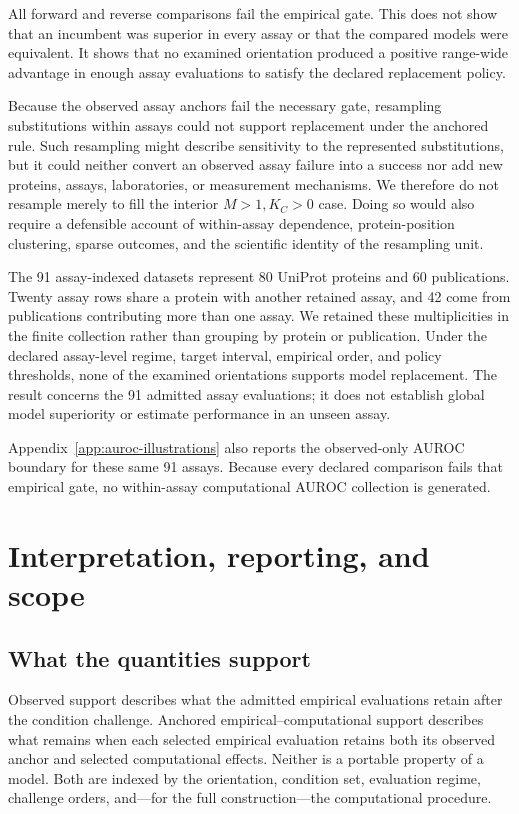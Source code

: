 \documentclass[11pt]{article}
\theoremstyle{remark}
\begin{document}
All forward and reverse comparisons fail the empirical gate. This does not show
that an incumbent was superior in every assay or that the compared models were
equivalent. It shows that no examined orientation produced a positive
range-wide advantage in enough assay evaluations to satisfy the declared
replacement policy.

Because the observed assay anchors fail the necessary gate, resampling
substitutions within assays could not support replacement under the anchored
rule. Such resampling might describe sensitivity to the represented
substitutions, but it could neither convert an observed assay failure into a
success nor add new proteins, assays, laboratories, or measurement mechanisms.
We therefore do not resample merely to fill the interior $M>1,K_C>0$ case.
Doing so would also require a defensible account of within-assay dependence,
protein-position clustering, sparse outcomes, and the scientific identity of
the resampling unit.

The 91 assay-indexed datasets represent 80 UniProt proteins and 60
publications. Twenty assay rows share a protein with another retained assay,
and 42 come from publications contributing more than one assay. We retained
these multiplicities in the finite collection rather than grouping by protein
or publication. Under the declared assay-level regime, target interval,
empirical order, and policy thresholds, none of the examined orientations
supports model replacement. The result concerns the 91 admitted assay
evaluations; it does not establish global model superiority or estimate
performance in an unseen assay.

Appendix~\ref{app:auroc-illustrations} also reports the observed-only AUROC
boundary for these same 91 assays. Because every declared comparison fails
that empirical gate, no within-assay computational AUROC collection is
generated.


\section{Interpretation, reporting, and scope}
\label{sec:discussion}

\subsection{What the quantities support}

Observed support describes what the admitted empirical evaluations retain
after the condition challenge. Anchored empirical--computational support
describes what remains when each selected empirical evaluation retains both
its observed anchor and selected computational effects. Neither is a portable
property of a model. Both are indexed by the orientation, condition set,
evaluation regime, challenge orders, and---for the full construction---the
computational procedure.
\end{document}
